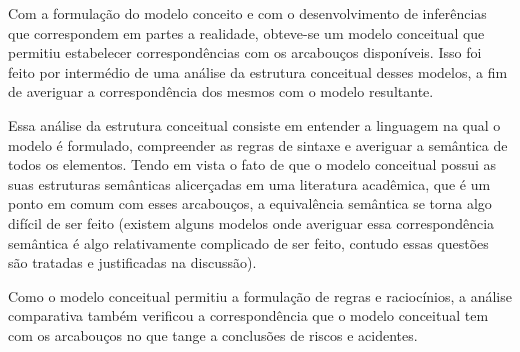 Com a formulação do modelo conceito e com o desenvolvimento de inferências que correspondem em partes a realidade, obteve-se um modelo conceitual que permitiu estabelecer correspondências com os arcabouços disponíveis. Isso foi feito por intermédio de uma análise da estrutura conceitual desses modelos, a fim de averiguar a correspondência dos mesmos com o modelo resultante.

Essa análise da estrutura conceitual consiste em entender a linguagem na qual o modelo é formulado, compreender as regras de sintaxe e averiguar a semântica de todos os elementos. Tendo em vista o fato de que o modelo conceitual possui as suas estruturas semânticas alicerçadas em uma literatura acadêmica, que é um ponto em comum com esses arcabouços, a equivalência semântica se torna algo difícil de ser feito (existem alguns modelos onde averiguar essa correspondência semântica é algo relativamente complicado de ser feito, contudo essas questões são tratadas e justificadas na discussão).

Como o modelo conceitual permitiu a formulação de regras e raciocínios, a análise comparativa também verificou a correspondência que o modelo conceitual tem com os arcabouços no que tange a conclusões de riscos e acidentes.